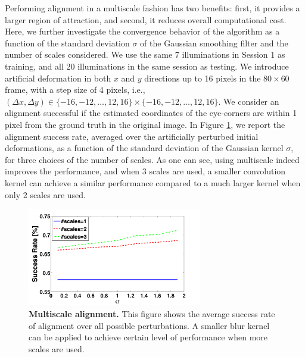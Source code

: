 \documentclass[10pt,journal,letterpaper,compsoc]{IEEEtran} %
\begin{document}
Performing alignment in a multiscale fashion has two benefits: first, it provides a larger region of attraction, and second, it reduces overall computational cost. Here, we further investigate the convergence behavior of the algorithm as a function of the standard deviation $\sigma$ of the Gaussian smoothing filter and the number of scales considered.
We use the same 7 illuminations in
Session 1 as training, and all 20 illuminations in the same
session as testing. We introduce artificial deformation in
both $x$ and $y$ directions up to 16 pixels in the
$80\times 60$ frame, with a step size of 4 pixels, i.e.,
$(\Delta x, \Delta y) \in \{-16,-12,\ldots,12,16\} \times
\{-16,-12,\ldots,12,16\}$. We consider an alignment
successful if the estimated coordinates of the eye-corners
are within 1 pixel from the ground truth in the original
image.  In Figure \ref{fig:multiscale}, we report the
alignment success rate, averaged over the artificially
perturbed initial deformations, as a function of the
standard deviation of the Gaussian kernel $\sigma$, for
three choices of the number of scales. As one can see,
using multiscale indeed improves the performance, and when
3 scales are used, a smaller convolution kernel can achieve
a similar performance compared to a much larger kernel when
only 2 scales are used.
\begin{figure}
\centering
\includegraphics[width=3in]{figures_pami/multiscale.png}
\vspace{-2mm}
\caption{{\bf Multiscale alignment.} This figure shows the average success rate of alignment over all possible perturbations. A smaller blur kernel can be applied to achieve certain level of performance when more scales are used.}
\label{fig:multiscale}
\vspace{-4mm}
\end{figure}
\end{document}
